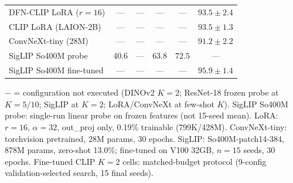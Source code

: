\documentclass[10pt,a4paper]{article}
\begin{document}
\begin{table}[!ht]
\begin{tabular}{lccccc}
\midrule
DFN-CLIP LoRA ($r{=}16$) & --- & --- & --- & --- & $93.5 \pm 2.4$ \\
CLIP LoRA (LAION-2B)     & --- & --- & --- & --- & $93.5 \pm 1.3$ \\
ConvNeXt-tiny (28M)      & --- & --- & --- & --- & $91.2 \pm 2.2$ \\
SigLIP So400M probe      & $40.6$ & --- & $63.8$ & $72.5$ & --- \\
SigLIP So400M fine-tuned & --- & --- & --- & --- & $95.9 \pm 1.4$ \\
\bottomrule
\end{tabular}
\smallskip
{\small $-$ = configuration not executed (DINOv2 $K{=}2$; ResNet-18 frozen probe at $K{=}5/10$; SigLIP at $K{=}2$; LoRA/ConvNeXt at few-shot $K$). SigLIP So400M probe: single-run linear probe on frozen features (not 15-seed mean). LoRA: $r{=}16$, $\alpha{=}32$, out\_proj only, 0.19\% trainable (799K/428M). ConvNeXt-tiny: torchvision pretrained, 28M params, 30 epochs. SigLIP: So400M-patch14-384, 878M params, zero-shot 13.0\%; fine-tuned on V100 32GB, $n{=}15$ seeds, 30 epochs. Fine-tuned CLIP $K{=}2$ cells: matched-budget protocol (9-config validation-selected search, 15 final seeds).}
\end{table}
\end{document}
